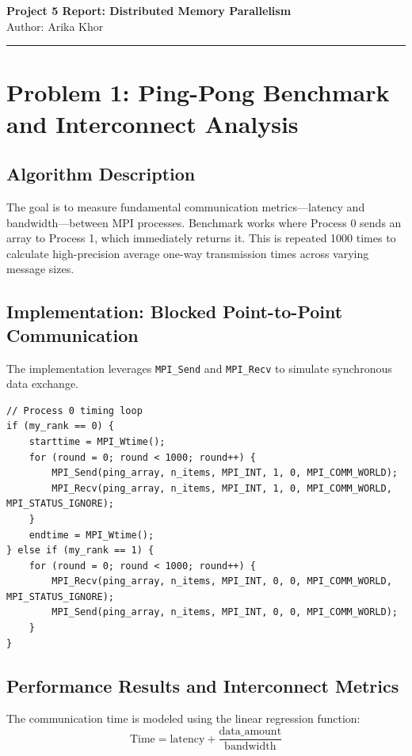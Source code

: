 \documentclass[11pt]{article}
\begin{document}
\begin{center}
    {\Large \textbf{Project 5 Report: Distributed Memory Parallelism}}\\
    \vspace{0.5em}
    Author: Arika Khor
\end{center}

\vspace{1em}

\noindent\rule{\textwidth}{0.4pt}

\section*{Problem 1: Ping-Pong Benchmark and Interconnect Analysis}

\subsection*{Algorithm Description}
The goal is to measure fundamental communication metrics—latency and bandwidth—between MPI processes. Benchmark works where Process 0 sends an array to Process 1, which immediately returns it. This is repeated 1000 times to calculate high-precision average one-way transmission times across varying message sizes.

\subsection*{Implementation: Blocked Point-to-Point Communication}
The implementation leverages \texttt{MPI\_Send} and \texttt{MPI\_Recv} to simulate synchronous data exchange.

\begin{lstlisting}
// Process 0 timing loop
if (my_rank == 0) {
    starttime = MPI_Wtime();
    for (round = 0; round < 1000; round++) {
        MPI_Send(ping_array, n_items, MPI_INT, 1, 0, MPI_COMM_WORLD);
        MPI_Recv(ping_array, n_items, MPI_INT, 1, 0, MPI_COMM_WORLD, MPI_STATUS_IGNORE);
    }
    endtime = MPI_Wtime();
} else if (my_rank == 1) {
    for (round = 0; round < 1000; round++) {
        MPI_Recv(ping_array, n_items, MPI_INT, 0, 0, MPI_COMM_WORLD, MPI_STATUS_IGNORE);
        MPI_Send(ping_array, n_items, MPI_INT, 0, 0, MPI_COMM_WORLD);
    }
}
\end{lstlisting}

\subsection*{Performance Results and Interconnect Metrics}
The communication time is modeled using the linear regression function:
\begin{equation*}
\text{Time} = \text{latency} + \frac{\text{data\_amount}}{\text{bandwidth}}
\end{equation*}
\end{document}
